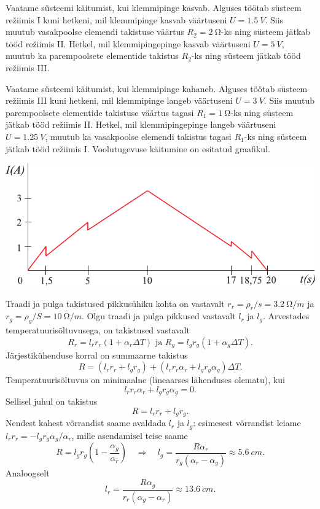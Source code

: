 \documentclass[10pt, twoside]{article}
\begin{document}
{Vaatame süsteemi käitumist, kui klemmipinge kasvab. Alguses töötab süsteem režiimis I kuni hetkeni, mil klemmipinge kasvab väärtuseni $U = \SI{1,5}{V}$. Siis muutub vasakpoolse elemendi takistuse väärtus $R_2 = \SI{2}{\ohm}$-ks ning süsteem jätkab tööd režiimis II. Hetkel, mil klemmipingepinge kasvab väärtuseni $U = \SI{5}{V}$, muutub ka parempoolsete elementide takistus $R_2$-ks ning süsteem jätkab tööd režiimis III.

Vaatame süsteemi käitumist, kui klemmipinge kahaneb. Alguses töötab süsteem režiimis III kuni hetkeni, mil klemmipinge langeb väärtuseni $U = \SI{3}{V}$. Siis muutub parempoolsete elementide takistuse väärtus tagasi $R_1 = \SI{1}{\ohm}$-ks ning süsteem jätkab tööd režiimis II. Hetkel, mil klemmipingepinge langeb väärtuseni $U = \SI{1,25}{V}$, muutub ka vasakpoolse elemendi takistus tagasi $R_1$-ks ning süsteem jätkab tööd režiimis I. Voolutugevuse käitumine on esitatud graafikul.

\begin{center}
	\includegraphics[width=0.9\linewidth]{2009-lahg-03-lah}
\end{center}
\probend
\bigskip


\solu
Traadi ja pulga takistused pikkusühiku kohta on vastavalt $r_r = \rho_r/s = \SI{3,2}{\ohm/m}$ ja $r_g = \rho_g/S = \SI{10}{\ohm/m}$. Olgu traadi ja pulga pikkused vastavalt $l_r$ ja $l_g$. Arvestades temperatuurisõltuvusega, on takistused vastavalt
\[
R_{r}=l_{r} r_{r}\left(1+\alpha_{r} \Delta T\right) \text { ja } R_{g}=l_{g} r_{g}\left(1+\alpha_{g} \Delta T\right).
\]
Järjestikühenduse korral on summaarne takistus
\[
R=\left(l_{r} r_{r}+l_{g} r_{g}\right)+\left(l_{r} r_{r} \alpha_{r}+l_{g} r_{g} \alpha_{g}\right) \Delta T.
\]
Temperatuurisõltuvus on minimaalne (lineaarses lähenduses olematu), kui
\[
l_{r} r_{r} \alpha_{r}+l_{g} r_{g} \alpha_{g}=0.
\]
Sellisel juhul on takistus
\[
R=l_{r} r_{r}+l_{g} r_{g}.
\]
Nendest kahest võrrandist saame avaldada $l_r$ ja $l_g$: esimesest võrrandist leiame $l_rr_r = -l_gr_g\alpha_g/\alpha_r$, mille asendamisel teise saame
\[
R=l_{g} r_{g}\left(1-\frac{\alpha_{g}}{\alpha_{r}}\right) \quad \Rightarrow \quad l_{g}=\frac{R \alpha_{r}}{r_{g}\left(\alpha_{r}-\alpha_{g}\right)} \approx \SI{5,6}{cm}.
\]
Analoogselt
\[
l_{r}=\frac{R \alpha_{g}}{r_{r}\left(\alpha_{g}-\alpha_{r}\right)} \approx \SI{13,6}{cm}.
\]
\probend
\bigskip

}
\end{document}
